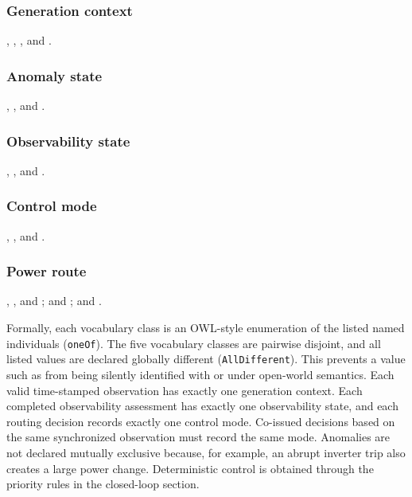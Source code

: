 \subsubsection{Generation context}

, , , and .

\subsubsection{Anomaly state}

, , and .

\subsubsection{Observability state}

, , and .

\subsubsection{Control mode}

, , and .

\subsubsection{Power route}

\noindent{}, , and ;\newline
{} and ;\newline
{} and .

Formally, each vocabulary class is an OWL-style enumeration of the listed named individuals (\texttt{oneOf}). The five vocabulary classes are pairwise disjoint, and all listed values are declared globally different (\texttt{AllDifferent}). This prevents a value such as  from being silently identified with  or  under open-world semantics.
Each valid time-stamped observation has exactly one generation context. Each completed observability assessment has exactly one observability state, and each routing decision records exactly one control mode. Co-issued decisions based on the same synchronized observation must record the same mode. Anomalies are not declared mutually exclusive because, for example, an abrupt inverter trip also creates a large power change. Deterministic control is obtained through the priority rules in the closed-loop section.

